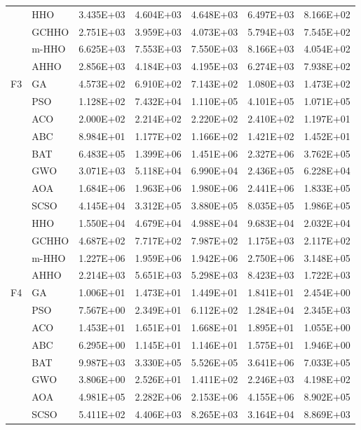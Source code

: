 \begin{longtable}{llrrrrr}
 & HHO & 3.435E+03 & 4.604E+03 & 4.648E+03 & 6.497E+03 & 8.166E+02 \\
 & GCHHO & 2.751E+03 & 3.959E+03 & 4.073E+03 & 5.794E+03 & 7.545E+02 \\
 & m-HHO & 6.625E+03 & 7.553E+03 & 7.550E+03 & 8.166E+03 & 4.054E+02 \\
 & AHHO & 2.856E+03 & 4.184E+03 & 4.195E+03 & 6.274E+03 & 7.938E+02 \\
\addlinespace
F3 & GA & 4.573E+02 & 6.910E+02 & 7.143E+02 & 1.080E+03 & 1.473E+02 \\
 & PSO & 1.128E+02 & 7.432E+04 & 1.110E+05 & 4.101E+05 & 1.071E+05 \\
 & ACO & 2.000E+02 & 2.214E+02 & 2.220E+02 & 2.410E+02 & 1.197E+01 \\
 & ABC & 8.984E+01 & 1.177E+02 & 1.166E+02 & 1.421E+02 & 1.452E+01 \\
 & BAT & 6.483E+05 & 1.399E+06 & 1.451E+06 & 2.327E+06 & 3.762E+05 \\
 & GWO & 3.071E+03 & 5.118E+04 & 6.990E+04 & 2.436E+05 & 6.228E+04 \\
 & AOA & 1.684E+06 & 1.963E+06 & 1.980E+06 & 2.441E+06 & 1.833E+05 \\
 & SCSO & 4.145E+04 & 3.312E+05 & 3.880E+05 & 8.035E+05 & 1.986E+05 \\
 & HHO & 1.550E+04 & 4.679E+04 & 4.988E+04 & 9.683E+04 & 2.032E+04 \\
 & GCHHO & 4.687E+02 & 7.717E+02 & 7.987E+02 & 1.175E+03 & 2.117E+02 \\
 & m-HHO & 1.227E+06 & 1.959E+06 & 1.942E+06 & 2.750E+06 & 3.148E+05 \\
 & AHHO & 2.214E+03 & 5.651E+03 & 5.298E+03 & 8.423E+03 & 1.722E+03 \\
\addlinespace
F4 & GA & 1.006E+01 & 1.473E+01 & 1.449E+01 & 1.841E+01 & 2.454E+00 \\
 & PSO & 7.567E+00 & 2.349E+01 & 6.112E+02 & 1.284E+04 & 2.345E+03 \\
 & ACO & 1.453E+01 & 1.651E+01 & 1.668E+01 & 1.895E+01 & 1.055E+00 \\
 & ABC & 6.295E+00 & 1.145E+01 & 1.146E+01 & 1.575E+01 & 1.946E+00 \\
 & BAT & 9.987E+03 & 3.330E+05 & 5.526E+05 & 3.641E+06 & 7.033E+05 \\
 & GWO & 3.806E+00 & 2.526E+01 & 1.411E+02 & 2.246E+03 & 4.198E+02 \\
 & AOA & 4.981E+05 & 2.282E+06 & 2.153E+06 & 4.155E+06 & 8.902E+05 \\
 & SCSO & 5.411E+02 & 4.406E+03 & 8.265E+03 & 3.164E+04 & 8.869E+03 \\

\end{longtable}
